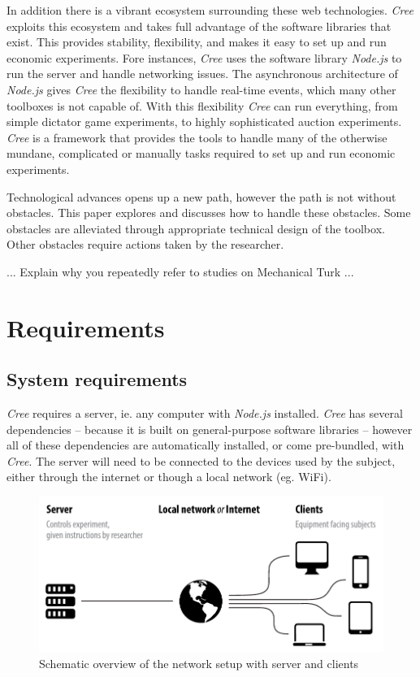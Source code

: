 \documentclass[preprint, 12pt]{elsarticle}
\newcommand{\Cree}{\emph{Cree}\xspace}
\begin{document}
In addition there is a vibrant ecosystem surrounding these web technologies. \Cree exploits this ecosystem and takes full advantage of the software libraries that exist. This provides stability, flexibility, and makes it easy to set up and run economic experiments. Fore instances, \Cree uses the software library \emph{Node.js} to run the server and handle networking issues. The asynchronous architecture of \emph{Node.js} gives \Cree the flexibility to handle real-time events, which many other toolboxes is not capable of. With this flexibility \Cree can run everything, from simple dictator game experiments, to highly sophisticated auction experiments. \Cree is a framework that provides the tools to handle many of the otherwise mundane, complicated or manually tasks required to set up and run economic experiments.

Technological advances opens up a new path, however the path is not without obstacles. This paper explores and discusses how to handle these obstacles. Some obstacles are alleviated through appropriate technical design of the toolbox. Other obstacles require actions taken by the researcher.

{\color{red}... Explain why you repeatedly refer to studies on Mechanical Turk ...}

\section{Requirements}
\label{S:Requirements}

\subsection{System requirements}

\Cree requires a server, ie. any computer with \emph{Node.js} installed\footnotemark[1]. \Cree has several dependencies -- because it is built on general-purpose software libraries -- however all of these dependencies are automatically installed, or come pre-bundled, with \Cree. The server will need to be connected to the devices used by the subject, either through the internet or though a local network (eg. WiFi). 

\begin{figure}[h!]
  \caption{Schematic overview of the network setup with server and clients}
  \centering
    \includegraphics[width=\textwidth]{figures/setup}
\end{figure}
\end{document}

